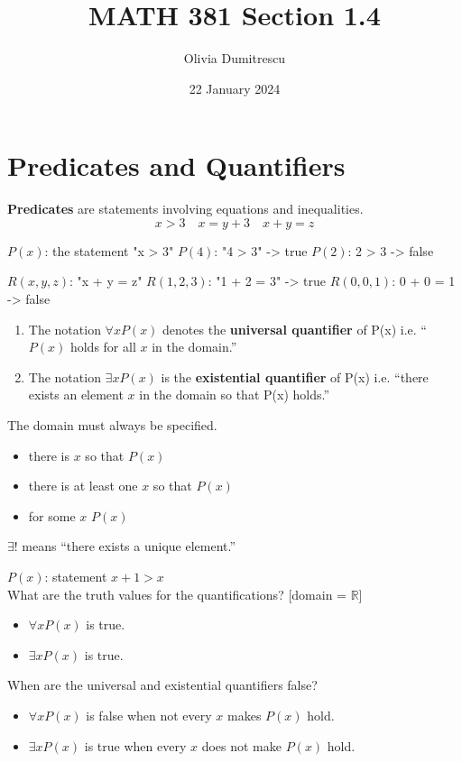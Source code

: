 \documentclass[a4paper, 12pt]{article}
\title{MATH 381 Section 1.4}
\author{Olivia Dumitrescu}
\date{22 January 2024}
\newenvironment{definition}[1][Definition]{\begin{trivlist}
\item[\hskip \labelsep {\bfseries #1}]}{\end{trivlist}}
\newenvironment{example}[1][Example]{\begin{trivlist}
\item[\hskip \labelsep {\bfseries #1}]}{\end{trivlist}}
\newenvironment{remark}[1][Remark]{\begin{trivlist}
\item[\hskip \labelsep {\bfseries #1}]}{\end{trivlist}}
\newcommand{\keyword}[1]{\textbf{#1}}
\begin{document}
    \maketitle
    \section*{Predicates and Quantifiers}
    \begin{definition}
        \keyword{Predicates} are statements involving equations and inequalities.
        \[x > 3 \quad x = y + 3 \quad x + y = z\]
    \end{definition}
    \begin{example}
        $P(x)$: the statement "x > 3"
        $P(4)$: "4 > 3" -> true
        $P(2)$: 2 > 3 -> false
    \end{example}
    \begin{example}
        $R(x, y, z)$: "x + y = z"
        $R(1, 2, 3)$: "1 + 2 = 3" -> true
        $R(0, 0, 1)$: 0 + 0 = 1 -> false
    \end{example}
    \begin{definition}
        \hfill
        \begin{enumerate}
            \item The notation $\forall x P(x)$ denotes the \keyword{universal quantifier}
            of P(x) i.e. ``$P(x)$ holds for all $x$ in the domain.''
            \item The notation $\exists x P(x)$ is the \keyword{existential quantifier}
            of P(x) i.e. ``there exists an element $x$ in the domain so that P(x) holds.''
        \end{enumerate}
    \end{definition}
    \begin{remark}
        The domain must always be specified.
        \begin{itemize}
            \item there is $x$ so that $P(x)$
            \item there is at least one $x$ so that $P(x)$
            \item for some $x$ $P(x)$
        \end{itemize}
        $\exists!$ means ``there exists a unique element.''
    \end{remark}
    \begin{example}
        $P(x)$: statement $x + 1 > x$\\
        What are the truth values for the quantifications? [domain = $\mathbb{R}$]
        \begin{itemize}
            \item $\forall x P(x)$ is true.
            \item $\exists x P(x)$ is true.
        \end{itemize}
        When are the universal and existential quantifiers false?
        \begin{itemize}
            \item $\forall x P(x)$ is false when not every $x$ makes $P(x)$ hold.
            \item $\exists x P(x)$ is true when every $x$ does not make $P(x)$ hold.
        \end{itemize}
    \end{example}
\end{document}
